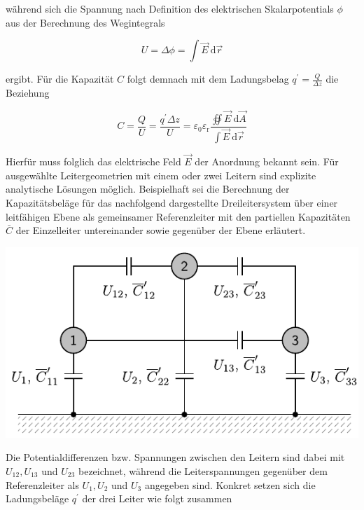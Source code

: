 während sich die Spannung nach Definition des elektrischen Skalarpotentials $\phi$ aus der Berechnung des Wegintegrals


\begin{equation}
	U=\Delta \phi=\int \vec{E} \mathrm{~d} \vec{r} 
\end{equation}


ergibt. Für die Kapazität $C$ folgt demnach mit dem Ladungsbelag $q^{\prime}=\frac{Q}{\Delta z}$ die Beziehung


\begin{equation}
	C=\frac{Q}{U}=\frac{q^{\prime} \Delta z}{U}=\varepsilon_{0} \varepsilon_{\mathrm{r}} \frac{\oiint \vec{E} \mathrm{~d} \vec{A}}{\int \vec{E} \mathrm{~d} \vec{r}} 
\end{equation}


Hierfür muss folglich das elektrische Feld $\vec{E}$ der Anordnung bekannt sein. Für ausgewählte Leitergeometrien mit einem oder zwei Leitern sind explizite analytische Lösungen möglich. Beispielhaft sei die Berechnung der Kapazitätsbeläge für das nachfolgend dargestellte Dreileitersystem über einer leitfähigen Ebene als gemeinsamer Referenzleiter mit den partiellen Kapazitäten $\bar{C}$ der Einzelleiter untereinander sowie gegenüber der Ebene erläutert.

\begin{center}
	\includegraphics{res/LT14}
\end{center}

Die Potentialdifferenzen bzw. Spannungen zwischen den Leitern sind dabei mit $U_{12}, U_{13}$ und $U_{23}$ bezeichnet, während die Leiterspannungen gegenüber dem Referenzleiter als $U_{1}, U_{2}$ und $U_{3}$ angegeben sind. Konkret setzen sich die Ladungsbeläge $q^{\prime}$ der drei Leiter wie folgt zusammen


